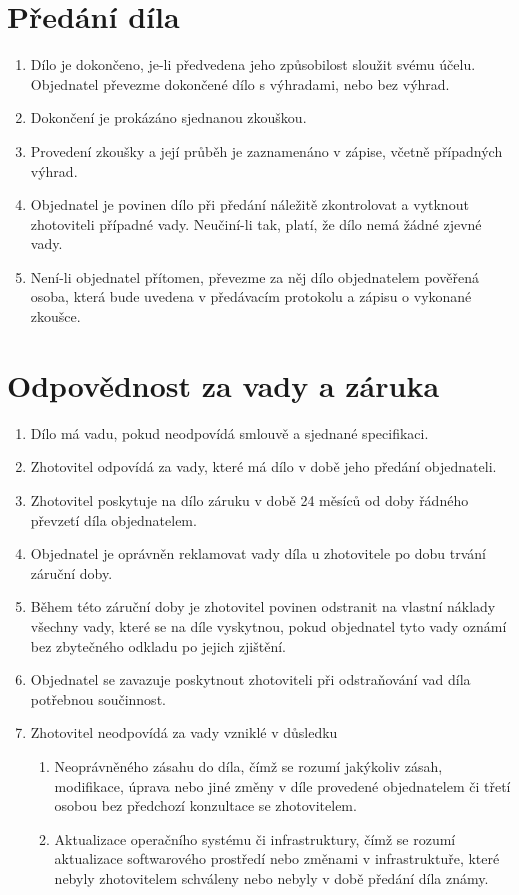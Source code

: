 \documentclass[]{article}
\begin{document}
\section{Předání díla}
\begin{enumerate}
	\item Dílo je dokončeno, je-li předvedena jeho způsobilost sloužit svému účelu. Objednatel převezme dokončené dílo s výhradami, nebo bez výhrad.
	\item Dokončení je prokázáno sjednanou zkouškou.
	\item Provedení zkoušky a její průběh je zaznamenáno v zápise, včetně případných výhrad.
	\item Objednatel je povinen dílo při předání náležitě zkontrolovat a vytknout zhotoviteli případné vady. Neučiní-li tak, platí, že dílo nemá žádné zjevné vady.
	\item Není-li objednatel přítomen, převezme za něj dílo objednatelem pověřená osoba, která bude uvedena v předávacím protokolu a zápisu o vykonané zkoušce.
\end{enumerate}

\section{Odpovědnost za vady a záruka}
\begin{enumerate}
	\item Dílo má vadu, pokud neodpovídá smlouvě a sjednané specifikaci.
	\item Zhotovitel odpovídá za vady, které má dílo v době jeho předání objednateli.
	\item Zhotovitel poskytuje na dílo záruku v době 24 měsíců od doby řádného převzetí díla objednatelem. 
	\item Objednatel je oprávněn reklamovat vady díla u zhotovitele po dobu trvání
	záruční doby.
	\item Během této záruční doby je zhotovitel povinen odstranit na vlastní náklady všechny vady, které se na díle vyskytnou, pokud objednatel tyto vady oznámí bez zbytečného odkladu po jejich zjištění.
	\item Objednatel se zavazuje poskytnout zhotoviteli při odstraňování vad díla potřebnou součinnost.
	\item Zhotovitel neodpovídá za vady vzniklé v důsledku
		\begin{enumerate}
			\item Neoprávněného zásahu do díla, čímž se rozumí jakýkoliv zásah, modifikace, úprava nebo jiné změny v díle provedené objednatelem či třetí osobou bez předchozí konzultace se zhotovitelem.
			\item Aktualizace operačního systému či infrastruktury, čímž se rozumí aktualizace softwarového prostředí nebo změnami v infrastruktuře, které nebyly zhotovitelem schváleny nebo nebyly v době předání díla známy.
		\end{enumerate}
\end{enumerate}
\end{document}
